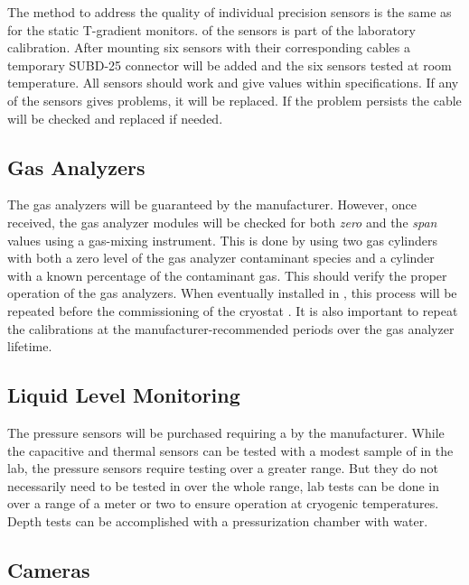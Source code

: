 The method to address the quality of individual precision sensors is the same as for the static T-gradient monitors.
 of the sensors is part of the laboratory calibration.  After mounting six sensors with their corresponding cables a
temporary SUBD-25 connector will be added and the six sensors tested at room temperature. All sensors should work and give values within specifications.  
If any of the sensors gives problems, it will be replaced.  If the problem persists the cable will be checked and replaced if needed.

\subsection{Gas Analyzers}
\label{sec:fdgen-slow-cryo-qc-ga}

The gas analyzers will be guaranteed by the manufacturer. However, once received, the gas analyzer modules will be checked for both \textit{zero} and the \textit{span} values using a gas-mixing instrument. This is done by using two gas cylinders with both a zero level of the gas analyzer contaminant species and a cylinder with a known percentage of the contaminant gas. This should verify the proper operation of the gas analyzers. When eventually installed in \surf, this process will be repeated before the commissioning of the cryostat . It is also important to repeat the calibrations at the manufacturer-recommended periods over the gas analyzer lifetime.
 

\subsection{Liquid Level Monitoring}
\label{sec:fdgen-slow-cryo-qc-llm}

The pressure sensors will be purchased requiring a  by the manufacturer.
While the capacitive and thermal sensors can be tested with a modest sample of \lar in the lab,
the pressure sensors require testing over a greater range.  But they do not
necessarily need to be tested in \lar over the whole range,  lab tests
can be done in \lar over a range of a meter or two to ensure operation
at cryogenic temperatures.  Depth tests can be accomplished with a
pressurization chamber with water.

\subsection{Cameras}
\label{sec:fdgen-slow-cryo-qc-c}

